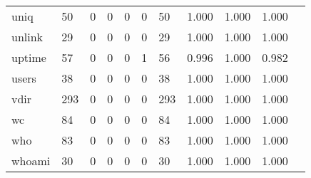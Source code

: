 \begin{longtable}{lp{1.10cm}p{1.10cm}p{1.10cm}p{1.10cm}p{1.10cm}p{1.10cm}p{1.10cm}p{1.10cm}p{1.10cm}p{1.10cm}}
uniq      &                     50 &                                  0 &                                 0 &                                0 &                                 0 &                              50 &                          1.000 &                                 1.000 &                               1.000 \\
unlink    &                     29 &                                  0 &                                 0 &                                0 &                                 0 &                              29 &                          1.000 &                                 1.000 &                               1.000 \\
uptime    &                     57 &                                  0 &                                 0 &                                0 &                                 1 &                              56 &                          0.996 &                                 1.000 &                               0.982 \\
users     &                     38 &                                  0 &                                 0 &                                0 &                                 0 &                              38 &                          1.000 &                                 1.000 &                               1.000 \\
vdir      &                    293 &                                  0 &                                 0 &                                0 &                                 0 &                             293 &                          1.000 &                                 1.000 &                               1.000 \\
wc        &                     84 &                                  0 &                                 0 &                                0 &                                 0 &                              84 &                          1.000 &                                 1.000 &                               1.000 \\
who       &                     83 &                                  0 &                                 0 &                                0 &                                 0 &                              83 &                          1.000 &                                 1.000 &                               1.000 \\
whoami    &                     30 &                                  0 &                                 0 &                                0 &                                 0 &                              30 &                          1.000 &                                 1.000 &                               1.000 \\

\end{longtable}
